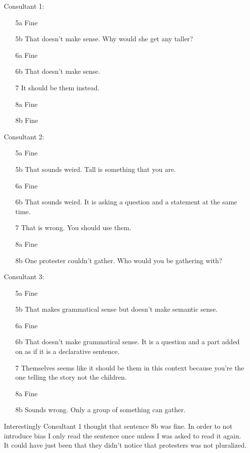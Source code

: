 \documentclass[20pt]{article}
\begin{document}
Consultant 1:
\begin{enumerate}
  \itemsep0em 
  \item[5a] Fine
  \item[5b] That doesn't make sense. Why would she get any taller?
  \item[6a] Fine
  \item[6b] That doesn't make sense.
  \item[7]  It should be them instead.
  \item[8a] Fine
  \item[8b] Fine
\end{enumerate}

\newpage

Consultant 2:
\begin{enumerate}
  \itemsep0em 
\item[5a] Fine
\item[5b] That sounds weird. Tall is something that you are.
\item[6a] Fine
\item[6b] That sounds weird. It is asking a question and a statement at the
  same time.
\item[7]  That is wrong. You should use them.
\item[8a] Fine
\item[8b] One protester couldn't gather. Who would you be gathering with?
\end{enumerate}

Consultant 3:
\begin{enumerate}
  \itemsep0em 
  \item[5a] Fine
  \item[5b] That makes grammatical sense but doesn't make semantic sense.
  \item[6a] Fine
  \item[6b] That doesn't make grammatical sense. It is a question and a part
    added on as if it is a declarative sentence.
  \item[7]  Themselves seems like it should be them in this context because
    you're the one telling the story not the children.
  \item[8a] Fine
  \item[8b] Sounds wrong. Only a group of something can gather.
\end{enumerate}

Interestingly Consultant 1 thought that sentence 8b was fine. In order to not
introduce bias I only read the sentence once unless I was asked to read it
again. It could have just been that they didn't notice that protesters was not
pluralized.
\end{document}
